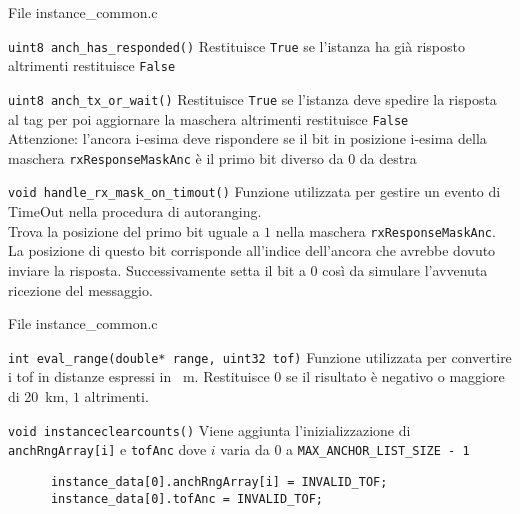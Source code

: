 \begin{frame}[shrink = 10]{File instance\_common.c}%
  \begin{block}{\lstinline!uint8 anch_has_responded()!}
    Restituisce \lstinline!True! se l'istanza ha già risposto altrimenti restituisce \lstinline!False!
  \end{block}
  \begin{block}{\lstinline!uint8 anch_tx_or_wait()!}
    Restituisce \lstinline!True! se l'istanza deve spedire la risposta al tag per poi aggiornare la maschera altrimenti restituisce \lstinline!False!\\
    \textcolor{dgreen}{Attenzione:} l'ancora i-esima deve rispondere se il bit in posizione i-esima della maschera \lstinline!rxResponseMaskAnc! è il primo bit diverso da $0$
    da destra
  \end{block}
  \begin{block}{\lstinline!void handle_rx_mask_on_timout()!}
    Funzione utilizzata per gestire un evento di TimeOut nella procedura di autoranging.\\
    Trova la posizione del primo bit uguale a $1$ nella maschera \lstinline!rxResponseMaskAnc!. La posizione di questo bit corrisponde all'indice dell'ancora che avrebbe
    dovuto inviare la risposta. Successivamente setta il bit a $0$ così da simulare l'avvenuta ricezione del messaggio.
  \end{block}
\end{frame}

\begin{frame}[fragile]{File instance\_common.c}
  \begin{block}{\lstinline!int eval_range(double* range, uint32 tof)!}
    Funzione utilizzata per convertire i tof in distanze espressi in \SI{}{\meter}. Restituisce $0$ se il risultato è negativo o maggiore di \SI{20}{\kilo\meter}, 
    $1$ altrimenti.
  \end{block}
  \begin{block}{\lstinline!void instanceclearcounts()!}
    Viene aggiunta l'inizializzazione di \lstinline!anchRngArray[i]! e \lstinline!tofAnc!
    dove $i$ varia da $0$ a \lstinline!MAX_ANCHOR_LIST_SIZE - 1!
    \begin{lstlisting}
      instance_data[0].anchRngArray[i] = INVALID_TOF;
      instance_data[0].tofAnc = INVALID_TOF;
    \end{lstlisting}
  \end{block}
\end{frame}


